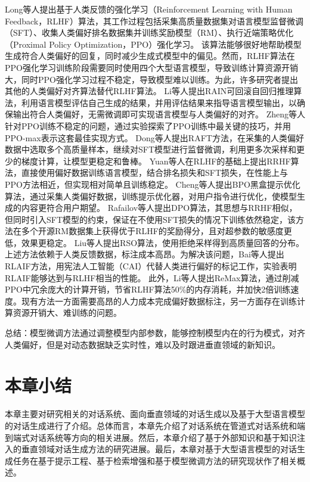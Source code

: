 Long等人\cite{DBLP:conf/nips/Ouyang0JAWMZASR22}提出基于人类反馈的强化学习（Reinforcement Learning with Human Feedback，RLHF）算法，其工作过程包括采集高质量数据集对语言模型监督微调（SFT）、收集人类偏好排名数据集并训练奖励模型（RM）、执行近端策略优化（Proximal Policy Optimization，PPO）强化学习。
该算法能够很好地帮助模型生成符合人类偏好的回复，同时减少生成式模型中的偏见。然而，RLHF算法在PPO强化学习训练阶段需要同时使用四个大型语言模型，导致训练计算资源开销大，同时PPO强化学习过程不稳定，导致模型难以训练。为此，许多研究者提出其他的人类偏好对齐算法替代RLHF算法。
Li等人\cite{DBLP:journals/corr/abs-2309-07124}提出RAIN可回滚自回归推理算法，利用语言模型评估自己生成的结果，并用评估结果来指导语言模型输出，以确保输出符合人类偏好，无需微调即可实现语言模型与人类偏好的对齐。
Zheng等人\cite{DBLP:journals/corr/abs-2307-04964}针对PPO训练不稳定的问题，通过实验探索了PPO训练中最关键的技巧，并用PPO-max表示这套最佳实现方式。
Dong等人\cite{DBLP:journals/corr/abs-2304-06767}提出RAFT方法，在采集的人类偏好数据中选取多个高质量样本，继续对SFT模型进行监督微调，利用更多次采样和更少的梯度计算，让模型更稳定和鲁棒。
Yuan等人\cite{DBLP:journals/corr/abs-2304-05302}在RLHF的基础上提出RRHF算法，直接使用偏好数据训练语言模型，结合排名损失和SFT损失，在性能上与PPO方法相近，但实现相对简单且训练稳定。
Cheng等人\cite{DBLP:journals/corr/abs-2311-04155}提出BPO黑盒提示优化算法，通过采集人类偏好数据，训练提示优化器，对用户指令进行优化，使模型生成的内容更符合用户期望。
Rafailov等人\cite{DBLP:conf/nips/RafailovSMMEF23}提出DPO算法，其思想与RRHF相似，但同时引入SFT模型的约束，保证在不使用SFT损失的情况下训练依然稳定，该方法在多个开源RM数据集上获得优于RLHF的奖励得分，且对超参数的敏感度更低，效果更稳定。
Liu等人\cite{DBLP:journals/corr/abs-2309-06657}提出RSO算法，使用拒绝采样得到高质量回答的分布。
上述方法依赖于人类反馈数据，标注成本高昂。为解决该问题，Bai等人\cite{DBLP:journals/corr/abs-2212-08073}提出RLAIF方法，用宪法人工智能（CAI）代替人类进行偏好的标记工作，实验表明RLAIF能够达到与RLHF相当的性能。
此外，Li等人\cite{DBLP:journals/corr/abs-2310-10505}提出ReMax算法，通过削减PPO中冗余庞大的计算开销，节省RLHF算法50\%的内存消耗，并加快2倍训练速度。现有方法一方面需要高昂的人力成本完成偏好数据标注，另一方面存在训练计算资源开销大、难训练的问题。

总结：模型微调方法通过调整模型内部参数，能够控制模型内在的行为模式，对齐人类偏好，但是对动态数据缺乏实时性，难以及时跟进垂直领域的新知识。

\section{本章小结}

本章主要对研究相关的对话系统、面向垂直领域的对话生成以及基于大型语言模型的对话生成进行了介绍。总体而言，本章先介绍了对话系统在管道式对话系统和端到端式对话系统等方向的相关进展。然后，本章介绍了基于外部知识和基于知识注入的垂直领域对话生成方法的研究进展。最后，本章对基于大型语言模型的对话生成任务在基于提示工程、基于检索增强和基于模型微调方法的研究现状作了相关概述。